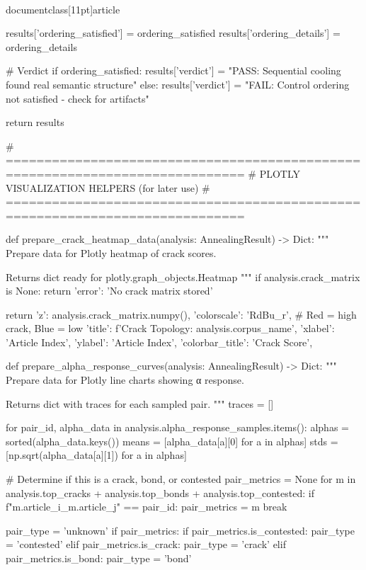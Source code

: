 \\documentclass[11pt]{article}
\begin{document}
\begin{CodeBlock}
{{{{{{{{{{    results['ordering_satisfied'] = ordering_satisfied
    results['ordering_details'] = ordering_details
    
    # Verdict
    if ordering_satisfied:
        results['verdict'] = "PASS: Sequential cooling found real semantic structure"
    else:
        results['verdict'] = "FAIL: Control ordering not satisfied - check for artifacts"
    
    return results


# =============================================================================
# PLOTLY VISUALIZATION HELPERS (for later use)
# =============================================================================

def prepare_crack_heatmap_data(analysis: AnnealingResult) -> Dict:
    """
    Prepare data for Plotly heatmap of crack scores.
    
    Returns dict ready for plotly.graph_objects.Heatmap
    """
    if analysis.crack_matrix is None:
        return {'error': 'No crack matrix stored'}
    
    return {
        'z': analysis.crack_matrix.numpy(),
        'colorscale': 'RdBu_r',  # Red = high crack, Blue = low
        'title': f'Crack Topology: {analysis.corpus_name}',
        'xlabel': 'Article Index',
        'ylabel': 'Article Index',
        'colorbar_title': 'Crack Score',
    }


def prepare_alpha_response_curves(analysis: AnnealingResult) -> Dict:
    """
    Prepare data for Plotly line charts showing α response.
    
    Returns dict with traces for each sampled pair.
    """
    traces = []
    
    for pair_id, alpha_data in analysis.alpha_response_samples.items():
        alphas = sorted(alpha_data.keys())
        means = [alpha_data[a][0] for a in alphas]
        stds = [np.sqrt(alpha_data[a][1]) for a in alphas]
        
        # Determine if this is a crack, bond, or contested
        pair_metrics = None
        for m in analysis.top_cracks + analysis.top_bonds + analysis.top_contested:
            if f"{m.article_i}_{m.article_j}" == pair_id:
                pair_metrics = m
                break
        
        pair_type = 'unknown'
        if pair_metrics:
            if pair_metrics.is_contested:
                pair_type = 'contested'
            elif pair_metrics.is_crack:
                pair_type = 'crack'
            elif pair_metrics.is_bond:
                pair_type = 'bond'
        
}}}}}}}}}}
\end{CodeBlock}
\end{document}
